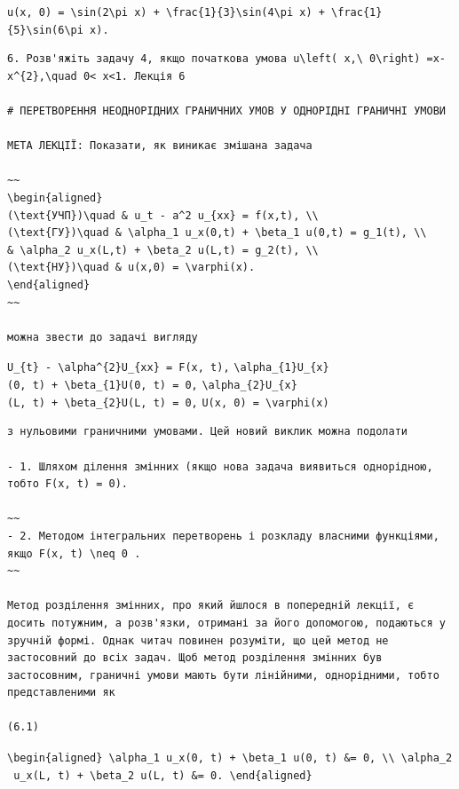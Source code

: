 \documentclass[
  ukrainian,
]{article}
\begin{document}
\texttt{u(x,\ 0)\ =\ \textbackslash{}sin(2\textbackslash{}pi\ x)\ +\ \textbackslash{}frac\{1\}\{3\}\textbackslash{}sin(4\textbackslash{}pi\ x)\ +\ \textbackslash{}frac\{1\}\{5\}\textbackslash{}sin(6\textbackslash{}pi\ x).}

\begin{verbatim}
6. Розв'яжіть задачу 4, якщо початкова умова u\left( x,\ 0\right) =x-x^{2},\quad 0< x<1. Лекція 6

# ПЕРЕТВОРЕННЯ НЕОДНОРІДНИХ ГРАНИЧНИХ УМОВ У ОДНОРІДНІ ГРАНИЧНІ УМОВИ

МЕТА ЛЕКЦІЇ: Показати, як виникає змішана задача

~~
\begin{aligned}
(\text{УЧП})\quad & u_t - a^2 u_{xx} = f(x,t), \\
(\text{ГУ})\quad & \alpha_1 u_x(0,t) + \beta_1 u(0,t) = g_1(t), \\
& \alpha_2 u_x(L,t) + \beta_2 u(L,t) = g_2(t), \\
(\text{НУ})\quad & u(x,0) = \varphi(x).
\end{aligned}
~~

можна звести до задачі вигляду
\end{verbatim}

\texttt{U\_\{t\}\ -\ \textbackslash{}alpha\^{}\{2\}U\_\{xx\}\ =\ F(x,\ t),}
\texttt{\textbackslash{}alpha\_\{1\}U\_\{x\}(0,\ t)\ +\ \textbackslash{}beta\_\{1\}U(0,\ t)\ =\ 0,}
\texttt{\textbackslash{}alpha\_\{2\}U\_\{x\}(L,\ t)\ +\ \textbackslash{}beta\_\{2\}U(L,\ t)\ =\ 0,}
\texttt{U(x,\ 0)\ =\ \textbackslash{}varphi(x)}

\begin{verbatim}
з нульовими граничними умовами. Цей новий виклик можна подолати

- 1. Шляхом ділення змінних (якщо нова задача виявиться однорідною, тобто F(x, t) = 0).

~~
- 2. Методом інтегральних перетворень і розкладу власними функціями, якщо F(x, t) \neq 0 .
~~

Метод розділення змінних, про який йшлося в попередній лекції, є досить потужним, а розв'язки, отримані за його допомогою, подаються у зручній формі. Однак читач повинен розуміти, що цей метод не застосовний до всіх задач. Щоб метод розділення змінних був застосовним, граничні умови мають бути лінійними, однорідними, тобто представленими як

(6.1)
\end{verbatim}

\texttt{\textbackslash{}begin\{aligned\}\ \textbackslash{}alpha\_1\ u\_x(0,\ t)\ +\ \textbackslash{}beta\_1\ u(0,\ t)\ \&=\ 0,\ \textbackslash{}\textbackslash{}\ \textbackslash{}alpha\_2\ u\_x(L,\ t)\ +\ \textbackslash{}beta\_2\ u(L,\ t)\ \&=\ 0.\ \textbackslash{}end\{aligned\}}
\end{document}
